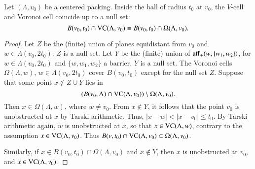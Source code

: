 \begin{lemma}
Let $(\Lambda,v_0)$ be a centered packing.
Inside the ball of radius $t_0$ at $v_0$, the $V$-cell and
Voronoi cell coincide up to a null set:
   $$B(v_0,t_0)\cap {\operatorname{VC}}(\Lambda,v_0) \equiv B(v_0,t_0)\cap \Omega(\Lambda,v_0).$$
\end{lemma}

\begin{proof} Let $Z$ be the (finite) union of planes equidistant from $v_0$ and $w\in \Lambda(v_0,2t_0)$.  $Z$ is a null set.  Let $Y$ be the (finite) union of ${\operatorname{aff}}_+(w,\{w_1,w_2\})$, for $w\in \Lambda(v_0,2t_0)$ and $\{w,w_1,w_2\}$ a barrier.  $Y$ is a null set.
The Voronoi cells $\Omega(\Lambda,w)$, $w\in\Lambda(v_0,2t_0)$ cover
$B(v_0,t_0)$ except for the null set $Z$.  
Suppose that some point  $x\not\in Z\cup Y$
lies in $$(B(v_0,\Lambda)\cap{\operatorname{VC}}(\Lambda,v_0) )\setminus \Omega(\Lambda,v_0).$$
Then $x\in \Omega(\Lambda,w)$, where
$w\ne v_0$.  
From $x\not\in Y$, it follows that the point $v_0$ is
unobstructed  at $x$ by Tarski arithmetic.  
Thus, $|x-w|< |x-v_0|\le t_0$.  By
Tarski arithmetic again, $w$ is unobstructed at $x$, so
that $x\in {\operatorname{VC}}(\Lambda,w)$, contrary to the assumption
$x\in{\operatorname{VC}}(\Lambda,v_0)$.  Thus $B(v,t_0)\cap{\operatorname{VC}}(\Lambda,v_0)\subset\Omega(\Lambda,v_0)$.

Similarly, if $x\in B(v_0,t_0)\cap \Omega(\Lambda,v_0)$ and $x\not\in Y$,
then $x$ is
unobstructed at $v_0$, and $x\in {\operatorname{VC}}(\Lambda,v_0)$.
\end{proof}

\bigskip

%


